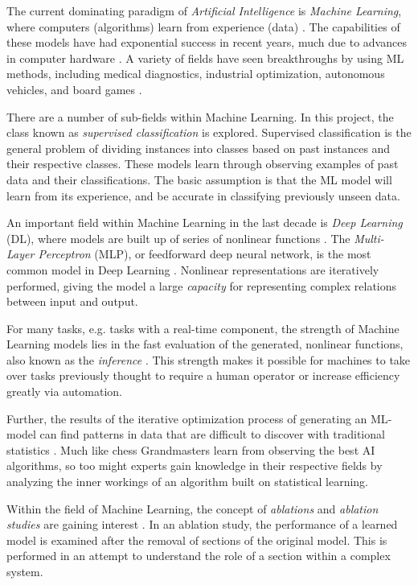 The current dominating paradigm of \textit{Artificial Intelligence} is \textit{Machine Learning}, where computers (algorithms) learn from experience (data) \cite{goodfellow2016deep}. The capabilities of these models have had exponential success in recent years, much due to advances in computer hardware \cite{goodfellow2016deep}. A variety of fields have seen breakthroughs by using \gls{ML} methods, including medical diagnostics, industrial optimization, autonomous vehicles, and board games \cite{goodfellow2016deep}. 

There are a number of sub-fields within Machine Learning. In this project, the class known as \textit{supervised classification} is explored. Supervised classification is the general problem of dividing instances into classes based on past instances and their respective classes. These models learn through observing examples of past data and their classifications. The basic assumption is that the \gls{ML} model will learn from its experience, and be accurate in classifying previously unseen data. 

An important field within Machine Learning in the last decade is \textit{Deep Learning} (\gls{DL}), where models are built up of series of nonlinear functions \cite{goodfellow2016deep}. The \textit{Multi-Layer Perceptron} (\gls{MLP}), or feedforward deep neural network, is the most common model in Deep Learning \cite{goodfellow2016deep}. Nonlinear representations are iteratively performed, giving the model a large \textit{capacity} for representing complex relations between input and output. 

For many tasks, e.g. tasks with a real-time component, the strength of Machine Learning models lies in the fast evaluation of the generated, nonlinear functions, also known as the \textit{inference} \cite{bertsimas2019online}. This strength makes it possible for machines to take over tasks previously thought to require a human operator or increase efficiency greatly via automation.

Further, the results of the iterative optimization process of generating an \gls{ML}-model can find patterns in data that are difficult to discover with traditional statistics \cite{goodfellow2016deep}. Much like chess Grandmasters learn from observing the best \gls{AI} algorithms, so too might experts gain knowledge in their respective fields by analyzing the inner workings of an algorithm built on statistical learning.  

Within the field of Machine Learning, the concept of \textit{ablations} and \textit{ablation studies} are gaining interest \cite{meyes2019ablation}. In an ablation study, the performance of a learned model is examined after the removal of sections of the original model. This is performed in an attempt to understand the role of a section within a complex system.  



